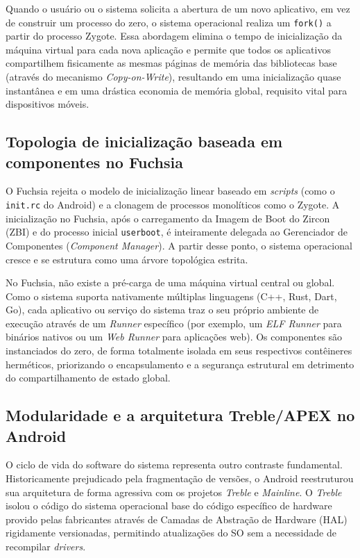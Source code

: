 \documentclass[12pt,a4paper]{article}
\begin{document}
Quando o usuário ou o sistema solicita a abertura de um novo aplicativo, em vez
de construir um processo do zero, o sistema operacional realiza um
\texttt{fork()} a partir do processo Zygote. Essa abordagem elimina o tempo de
inicialização da máquina virtual para cada nova aplicação e permite que todos os
aplicativos compartilhem fisicamente as mesmas páginas de memória das
bibliotecas base (através do mecanismo \emph{Copy-on-Write}), resultando em uma
inicialização quase instantânea e em uma drástica economia de memória global,
requisito vital para dispositivos móveis.

\subsection{Topologia de inicialização baseada em componentes no Fuchsia}

O Fuchsia rejeita o modelo de inicialização linear baseado em \emph{scripts}
(como o \texttt{init.rc} do Android) e a clonagem de processos monolíticos como
o Zygote. A inicialização no Fuchsia, após o carregamento da Imagem de Boot do
Zircon (ZBI) e do processo inicial \texttt{userboot}, é inteiramente delegada ao
Gerenciador de Componentes (\emph{Component Manager}). A partir desse ponto, o
sistema operacional cresce e se estrutura como uma árvore topológica estrita.

No Fuchsia, não existe a pré-carga de uma máquina virtual central ou global.
Como o sistema suporta nativamente múltiplas linguagens (C++, Rust, Dart, Go),
cada aplicativo ou serviço do sistema traz o seu próprio ambiente de execução
através de um \emph{Runner} específico (por exemplo, um \emph{ELF Runner} para
binários nativos ou um \emph{Web Runner} para aplicações web). Os componentes
são instanciados do zero, de forma totalmente isolada em seus respectivos
contêineres herméticos, priorizando o encapsulamento e a segurança estrutural em
detrimento do compartilhamento de estado global.

\subsection{Modularidade e a arquitetura Treble/APEX no Android}

O ciclo de vida do software do sistema representa outro contraste fundamental.
Historicamente prejudicado pela fragmentação de versões, o Android reestruturou
sua arquitetura de forma agressiva com os projetos \emph{Treble} e
\emph{Mainline}. O \emph{Treble} isolou o código do sistema operacional base do
código específico de hardware provido pelas fabricantes através de Camadas de
Abstração de Hardware (HAL) rigidamente versionadas, permitindo atualizações do
SO sem a necessidade de recompilar \emph{drivers}.
\end{document}
